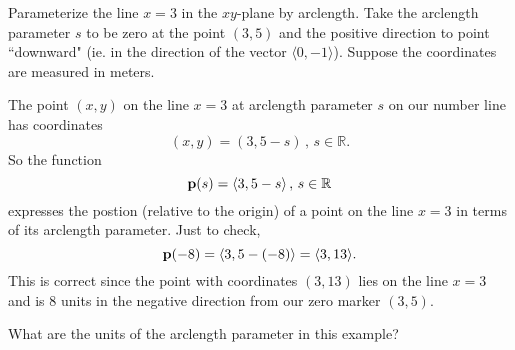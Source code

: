 \documentclass{ximera}
\begin{document}
\begin{example} \label{E324tg4tg45te}
Parameterize the line $x=3$ in the $xy$-plane by arclength. Take the arclength parameter $s$ to be zero at the point $(3,5)$ and the positive direction to point ``downward" (ie. in the direction of the vector $\langle 0, -1 \rangle$). Suppose the coordinates are measured in meters.

\begin{explanation}
The point $(x,y)$ on the line $x=3$ at arclength parameter $s$ on our number line has coordinates 
\[
   (x,y) = (3 , 5 - s) \, , \, s\in\mathbb{R}.
\] 
So the function
\[
    {\bf p}(s) = \langle 3, 5 - s \rangle \, , \, s\in\mathbb{R}
\]
expresses the postion (relative to the origin) of a point on the line $x=3$ in terms of its arclength parameter. Just to check,
\[
 {\bf p}(-8) = \langle 3, 5- (-8) \rangle = \langle 3, 13 \rangle .
\]
This is correct since the point with coordinates $(3,13)$ lies on the line $x=3$ and is $8$ units in the negative direction from our zero marker $(3,5)$.

\begin{question}\label{Qdefrd54555354}
What are the units of the arclength parameter in this example?
\begin{multipleChoice}
\end{multipleChoice}
\end{question}

\end{explanation}
\end{example}
\end{document}
